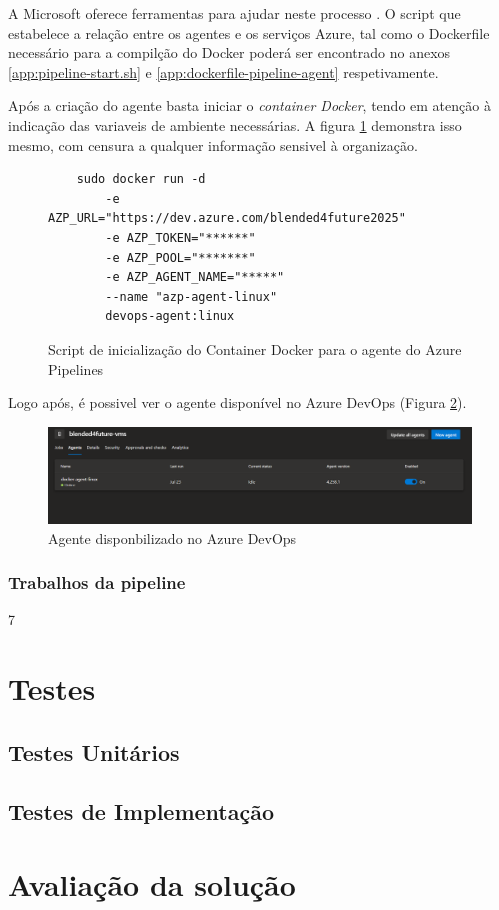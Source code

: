 A Microsoft oferece ferramentas para ajudar neste processo \cite{run-a-self-hosted-agent-in-docker}. O script que estabelece a relação entre os agentes e os serviços Azure, tal como o Dockerfile necessário para a compilção do Docker poderá ser encontrado no anexos \ref{app:pipeline-start.sh} e \ref{app:dockerfile-pipeline-agent} respetivamente.

Após a criação do agente basta iniciar o \textit{container Docker}, tendo em atenção à indicação das variaveis de ambiente necessárias. A figura \ref{fig:start-docker-agent} demonstra isso mesmo, com censura a qualquer informação sensivel à organização.

\begin{figure}
    

\begin{lstlisting}
    sudo docker run -d 
        -e AZP_URL="https://dev.azure.com/blended4future2025" 
        -e AZP_TOKEN="******" 
        -e AZP_POOL="*******" 
        -e AZP_AGENT_NAME="*****" 
        --name "azp-agent-linux" 
        devops-agent:linux
\end{lstlisting}


\caption{Script de inicialização do Container Docker para o agente do Azure Pipelines}
\label{fig:start-docker-agent}

\end{figure}

Logo após, é possivel ver o agente disponível no Azure DevOps (Figura \ref{fig:agent-devops}). 

\begin{figure}
\includegraphics[width=\linewidth]{capitulos/cap4-implementacao/assets/devops-agent.png}
\caption{Agente disponbilizado no Azure DevOps}
\label{fig:agent-devops}
\end{figure}

\subsubsection{Trabalhos da pipeline}

7

\section{Testes}

\subsection{Testes Unitários}

\subsection{Testes de Implementação}

\section{Avaliação da solução}